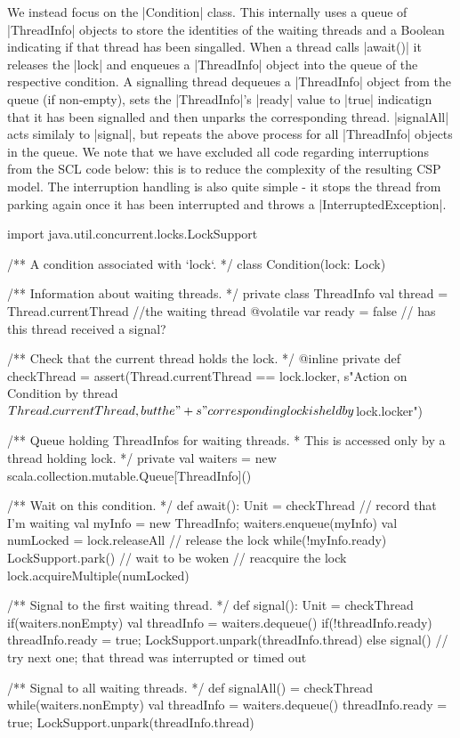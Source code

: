 We instead focus on the |Condition| class. This internally uses a queue of |ThreadInfo| objects to store the identities of the waiting threads and a Boolean indicating if that thread has been singalled. When a thread calls |await()| it releases the |lock| and enqueues a |ThreadInfo| object into the queue of the respective condition. A signalling thread dequeues a |ThreadInfo| object from the queue (if non-empty), sets the |ThreadInfo|'s |ready| value to |true| indicatign that it has been signalled and then unparks the corresponding thread. |signalAll| acts similaly to |signal|, but repeats the above process for all |ThreadInfo| objects in the queue. We note that we have excluded all code regarding interruptions from the SCL code below: this is to reduce the complexity of the resulting CSP model. The interruption handling is also quite simple - it stops the thread from parking again once it has been interrupted and throws a |InterruptedException|.

\begin{scala}[caption={A subset of the {\scalastyle Condition} class from \cite{GitHub}}, label={scala:Condition}]
import java.util.concurrent.locks.LockSupport

/** A condition associated with `lock`. */
class Condition(lock: Lock){
  /** Information about waiting threads. */
  private class ThreadInfo{
    val thread = Thread.currentThread //the waiting thread
    @volatile var ready = false // has this thread received a signal?
  }

  /** Check that the current thread holds the lock. */
  @inline private def checkThread = 
    assert(Thread.currentThread == lock.locker, 
      s"Action on Condition by thread ${Thread.currentThread}, but the "+
        s"corresponding lock is held by ${lock.locker}")

  /** Queue holding ThreadInfos for waiting threads.
    * This is accessed only by a thread holding lock. */
  private val waiters = new scala.collection.mutable.Queue[ThreadInfo]()

  /** Wait on this condition. */
  def await(): Unit = {
    checkThread
    // record that I'm waiting
    val myInfo = new ThreadInfo; waiters.enqueue(myInfo) 
    val numLocked = lock.releaseAll                 // release the lock
    while(!myInfo.ready){
      LockSupport.park()                            // wait to be woken
    }                              // reacquire the lock
    lock.acquireMultiple(numLocked)      
  }

  /** Signal to the first waiting thread. */
  def signal(): Unit = {
    checkThread
    if(waiters.nonEmpty){
      val threadInfo = waiters.dequeue()
      if(!threadInfo.ready){
        threadInfo.ready = true; LockSupport.unpark(threadInfo.thread)
      }
      else signal() // try next one; that thread was interrupted or timed out
    }      
  }

  /** Signal to all waiting threads. */
  def signalAll() = {
    checkThread
    while(waiters.nonEmpty){
      val threadInfo = waiters.dequeue()
      threadInfo.ready = true; LockSupport.unpark(threadInfo.thread)
    }      
  }
}
\end{scala}

